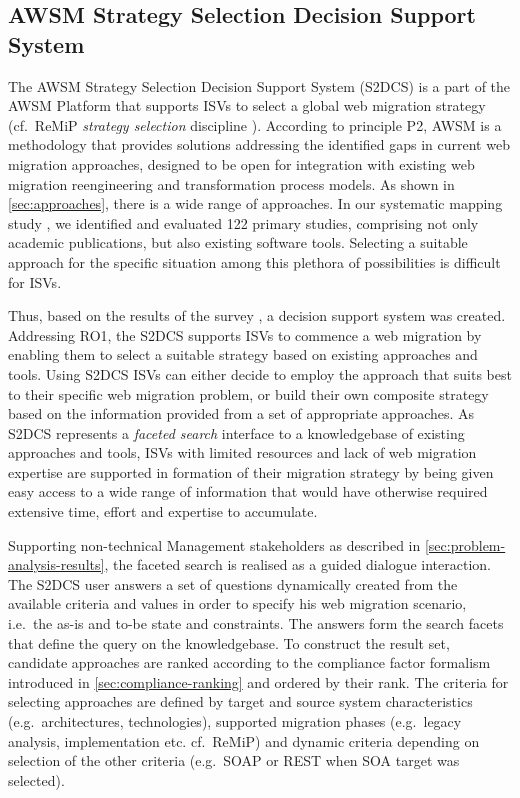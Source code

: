 \hypertarget{sec:s2dcs}{%
\subsection{AWSM Strategy Selection Decision Support System}\label{sec:s2dcs}}

The AWSM Strategy Selection Decision Support System (S2DCS) is a part of the AWSM Platform that supports ISVs to select a global web migration strategy (cf.~ReMiP \emph{strategy selection} discipline \autocite{Sneed2010ReMiP,Gipp2007ReMiP}).
According to principle P2, AWSM is a methodology that provides solutions addressing the identified gaps in current web migration approaches, designed to be open for integration with existing web migration reengineering and transformation process models.
As shown in \cref{sec:approaches}, there is a wide range of approaches.
In our systematic mapping study \autocite{Heil2017Survey}, we identified and evaluated 122 primary studies, comprising not only academic publications, but also existing software tools.
Selecting a suitable approach for the specific situation among this plethora of possibilities is difficult for ISVs.

Thus, based on the results of the survey \autocite{Heil2017Survey}, a decision support system was created.
Addressing RO1, the S2DCS supports ISVs to commence a web migration by enabling them to select a suitable strategy based on existing approaches and tools.
Using S2DCS ISVs can either decide to employ the approach that suits best to their specific web migration problem, or build their own composite strategy based on the information provided from a set of appropriate approaches.
As S2DCS represents a \emph{faceted search} interface \autocite{Tunkelang2009FacetedSearch} to a knowledgebase of existing approaches and tools, ISVs with limited resources and lack of web migration expertise are supported in formation of their migration strategy by being given easy access to a wide range of information that would have otherwise required extensive time, effort and expertise to accumulate.

Supporting non-technical Management stakeholders as described in \cref{sec:problem-analysis-results}, the faceted search is realised as a guided dialogue interaction.
The S2DCS user answers a set of questions dynamically created from the available criteria and values in order to specify his web migration scenario, i.e.~the as-is and to-be state \autocite{Nguyen2009} and constraints.
The answers form the search facets that define the query on the knowledgebase.
To construct the result set, candidate approaches are ranked according to the compliance factor formalism introduced in \cref{sec:compliance-ranking} and ordered by their rank.
The criteria for selecting approaches are defined by target and source system characteristics (e.g.~architectures, technologies), supported migration phases (e.g.~legacy analysis, implementation etc.
cf.~ReMiP) and dynamic criteria depending on selection of the other criteria (e.g.~SOAP or REST when SOA target was selected).


